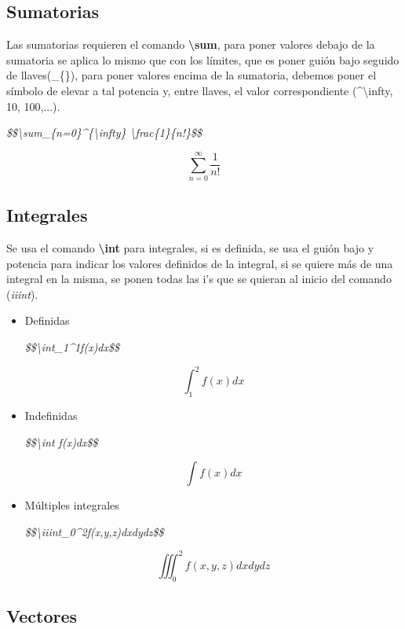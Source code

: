 \subsection{Sumatorias}

Las sumatorias requieren el comando \textbf{\textbackslash{sum}}, para poner valores debajo de la sumatoria se aplica lo mismo que con los límites, que es poner guión bajo seguido de llaves(\_\{\}), para poner valores encima de la sumatoria, debemos poner el símbolo de elevar a tal potencia y, entre llaves, el valor correspondiente (\textasciicircum{\textbackslash{infty}}, 10, 100,...).
\begin{center}
    \textit{\$\$\textbackslash{sum\_\{n=0\}}\textasciicircum{\{\textbackslash{infty}\}} \textbackslash{frac\{1\}\{n!\}}\$\$}
\end{center}
$$\sum_{n=0}^{\infty} \frac{1}{n!}$$


\subsection{Integrales}

Se usa el comando \textbf{\textbackslash{int}} para integrales, si es definida, se usa el guión bajo y potencia para indicar los valores definidos de la integral, si se quiere más de una integral en la misma, se ponen todas las i's que se quieran al inicio del comando (\textit{iiint}).
\begin{itemize}
    \item Definidas
    \begin{center}
        \textit{\$\$\textbackslash{int\_1\textasciicircum{1}}f(x)dx\$\$}
    \end{center}
    $$\int_1^2f(x)dx$$
    \item Indefinidas
    \begin{center}
        \textit{\$\$\textbackslash{int f(x)dx}\$\$}
    \end{center}
    $$\int f(x)dx$$
    \item Múltiples integrales
    \begin{center}
        \textit{\$\$\textbackslash{iiint\_0\textasciicircum{2}}f(x,y,z)dxdydz\$\$}
    \end{center}
    $$\iiint_0^2f(x,y,z)dxdydz$$
\end{itemize}


\subsection{Vectores}

